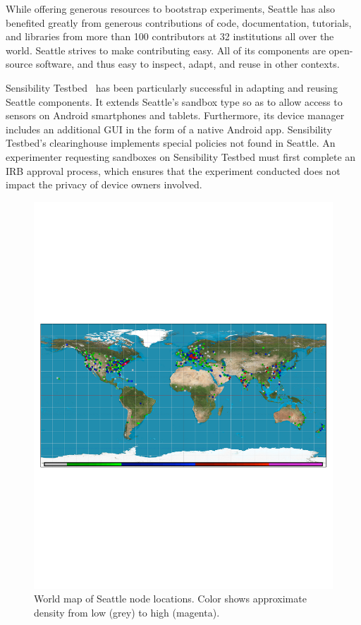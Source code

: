 While offering generous resources to bootstrap experiments,
Seattle has also benefited greatly from generous contributions
of code, documentation, tutorials, and libraries from more than 100
contributors at 32 institutions all over the world.
Seattle strives to make contributing easy. All of its components
are open-source software, and thus easy to inspect, adapt, and
reuse in other contexts.

Sensibility Testbed~\cite{zhuang2014sensibility} has been particularly
successful in adapting and reusing Seattle components. It extends
Seattle's sandbox type so as to allow access
to sensors on Android smartphones and tablets. Furthermore, its
device manager includes an additional \gls{GUI} in the form of
a native Android app. Sensibility Testbed's clearinghouse implements
special policies not found in Seattle. An experimenter requesting
sandboxes on Sensibility Testbed must first complete
an \gls{IRB} approval process, which ensures that the experiment conducted
does not impact the privacy of device owners involved.


\begin{figure}
  \centering
  \includegraphics[width=\columnwidth]{figures/finishedmap_ipinfo_small.pdf}
  \caption{World map of Seattle node locations. Color shows approximate density from low (grey) to high (magenta).}
  \label{fig:map}
\end{figure}
